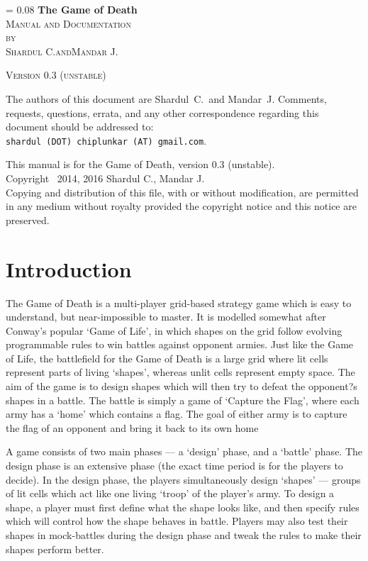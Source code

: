 \documentclass[a4paper,11pt]{article}
\newcommand*{\titleM}{\begingroup
\drop = 0.08\textheight
\centering
\vspace*{\drop}
{\Huge\bfseries The Game of Death}\\[\baselineskip]
{\scshape Manual and Documentation}\\[1.5\baselineskip]
{\scshape by}\\[0.6\baselineskip]
{\large\scshape Shardul C.\small\quad and\quad \large Mandar J.}\par
\vfill
{\scshape Version 0.3 (unstable)}\par
\vspace*{\drop}
\endgroup}
\begin{document}
\newlength{\drop}
\titleM
\thispagestyle{empty}

\newpage
\hspace{0pt}
\vfill

\noindent
The authors of this document are Shardul~C.\ and Mandar~J. Comments, requests, questions, errata, and any other correspondence regarding this document should be addressed to: \\
\texttt{shardul (DOT) chiplunkar (AT) gmail.com}.

\vspace{8pt}
\noindent
This manual is for the Game of Death, version 0.3 (unstable). \\
Copyright \textcopyright\ 2014, 2016 Shardul C., Mandar J. \\
Copying and distribution of this file, with or without modification, are permitted in any medium without royalty provided the copyright notice and this notice are preserved.

\newpage
\tableofcontents


\newpage
\section{Introduction}

The Game of Death is a multi-player grid-based strategy game which is easy to understand, but near-impossible to master. It is modelled somewhat after Conway's popular `Game of Life', in which shapes on the grid follow evolving programmable rules to win battles against opponent armies. Just like the Game of Life, the battlefield for the Game of Death is a large grid where lit cells represent parts of living `shapes', whereas unlit cells represent empty space. The aim of the game is to design shapes which will then try to defeat the opponent?s shapes in a battle. The battle is simply a game of `Capture the Flag', where each army has a `home' which contains a flag. The goal of either army is to capture the flag of an opponent and bring it back to its own home

A game consists of two main phases --- a `design' phase, and a `battle' phase. The design phase is an extensive phase (the exact time period is for the players to decide). In the design phase, the players simultaneously design `shapes' --- groups of lit cells which act like one living `troop' of the player's army. To design a shape, a player must first define what the shape looks like, and then specify rules which will control how the shape behaves in battle. Players may also test their shapes in mock-battles during the design phase and tweak the rules to make their shapes perform better.
\end{document}
